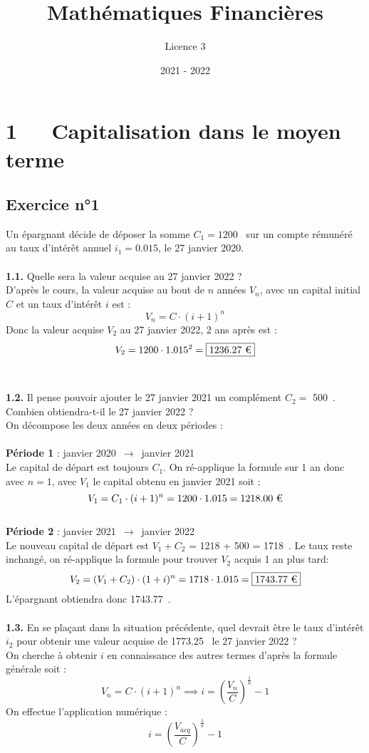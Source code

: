 \documentclass{article}
\title{Mathématiques Financières}
\author{Licence 3}
\date{2021 - 2022}
\begin{document}
\normalsize
\maketitle

\renewcommand*\contentsname{Table des matières}
\newpage

\section{1   Capitalisation dans le moyen terme}
\subsection{Exercice n°1}
\textcolor{exogris}{
Un épargnant décide de déposer la somme $C_1 = 1200$ \texteuro sur un compte rémunéré au taux d’intérêt annuel $i_1 = 0.015$, le 27 janvier 2020.
}
\\\\ \textcolor{exogris}{\textbf{1.1.}
Quelle sera la valeur acquise au 27 janvier 2022 ?
}
\\%
D'après le cours, la valeur acquise au bout de $n$ années $V_n$, avec un capital initial $C$ et un taux d'intérêt $i$ est :
$$V_n = C\cdot(i+1)^n$$
Donc la valeur acquise $V_2$ au 27 janvier 2022, 2 ans après est :
$$V_2 = 1200 \cdot 1.015^2 = \boxed{1236.27 \text{ \texteuro}}$$
\\%
\\%
\textcolor{exogris}{\textbf{1.2.}
Il pense pouvoir ajouter le 27 janvier 2021 un complément $C_2 =$ 500 \texteuro. Combien obtiendra-t-il le 27 janvier 2022 ?
}
\\%
On décompose les deux années en deux périodes :
\\\\\textbf{Période 1} : janvier 2020 $\rightarrow$ janvier 2021
\\Le capital de départ est toujours $C_1$. On ré-applique la formule sur 1 an donc avec $n=1$, avec $V_1$ le capital obtenu en janvier 2021 soit :
$$V_1 = C_1 \cdot (i+1)^n = 1200 \cdot 1.015 = 1218.00 \text{ \texteuro}$$
\\\textbf{Période 2} : janvier 2021 $\rightarrow$ janvier 2022
\\Le nouveau capital de départ est $V_1 + C_2$ = 1218 + 500 = 1718 \texteuro.
Le taux reste inchangé, on ré-applique la formule pour trouver $V_2$ acquis 1 an plus tard:
$$V_2 = (V_1 + C_2) \cdot (1+i)^n = 1718 \cdot 1.015 = \boxed{1743.77 \text{ \texteuro}}$$
L'épargnant obtiendra donc 1743.77 \texteuro.
\\%
\\%
\textcolor{exogris}{\textbf{1.3.}
En se plaçant dans la situation précédente, quel devrait être le taux d’intérêt $i_2$ pour obtenir une valeur
acquise de 1773.25 \texteuro le 27 janvier 2022 ?
}%
\\%
On cherche à obtenir $i$ en connaissance des autres termes d'après la formule générale soit :
$$V_n = C\cdot(i+1)^n \implies \boxed{i = \left(\dfrac{V_n}{C}\right)^{\frac{1}{n}}-1}$$
On effectue l'application numérique :
$$i = \left(\dfrac{V_{acq}}{C}\right)^{\frac{1}{n}}-1$$
\end{document}
